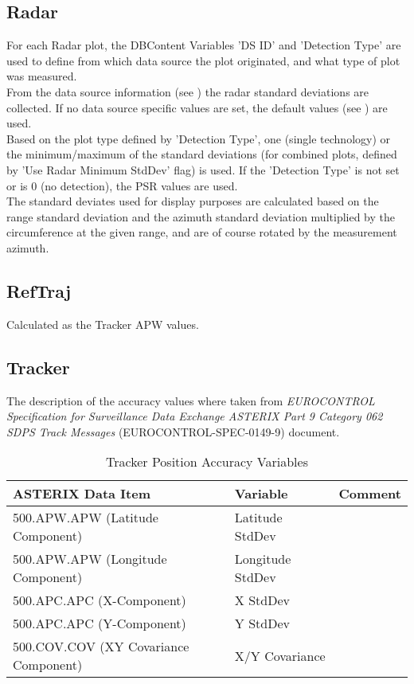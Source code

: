 \subsection{Radar}

For each Radar plot, the DBContent Variables 'DS ID' and 'Detection Type' are used to define from which data source the plot originated, and what type of plot was measured. \\

From the data source information (see ) the radar standard deviations are collected. If no data source specific values are set, the default values (see ) are used. \\

Based on the plot type defined by 'Detection Type', one (single technology) or the minimum/maximum of the standard deviations (for combined plots, defined by 'Use Radar Minimum StdDev' flag) is used. If the 'Detection Type' is not set or is 0 (no detection), the PSR values are used. \\ 

The standard deviates used for display purposes are calculated based on the range standard deviation and the azimuth standard deviation multiplied by the circumference at the given range, and are of course rotated by the measurement azimuth.

\subsection{RefTraj}

Calculated as the Tracker APW values.

\subsection{Tracker}

The description of the accuracy values where taken from \textit{EUROCONTROL Specification for Surveillance Data Exchange ASTERIX Part 9 Category 062 SDPS Track Messages} (EUROCONTROL-SPEC-0149-9) document.

\begin{center}
 \begin{table}[H]
  \begin{tabularx}{\textwidth}{ | X | l | l | }
    \hline
    \textbf{ASTERIX Data Item} & \textbf{Variable} & \textbf{Comment} \\ \hline
     500.APW.APW (Latitude Component) & Latitude StdDev &  \\ \hline
     500.APW.APW (Longitude Component) & Longitude StdDev  &  \\ \hline
     500.APC.APC (X-Component) & X StdDev &  \\ \hline
     500.APC.APC (Y-Component) & Y StdDev  &  \\ \hline
     500.COV.COV (XY Covariance Component) & X/Y Covariance  &  \\ \hline
\end{tabularx}
  \caption{Tracker Position Accuracy Variables}
\end{table}
\end{center}

